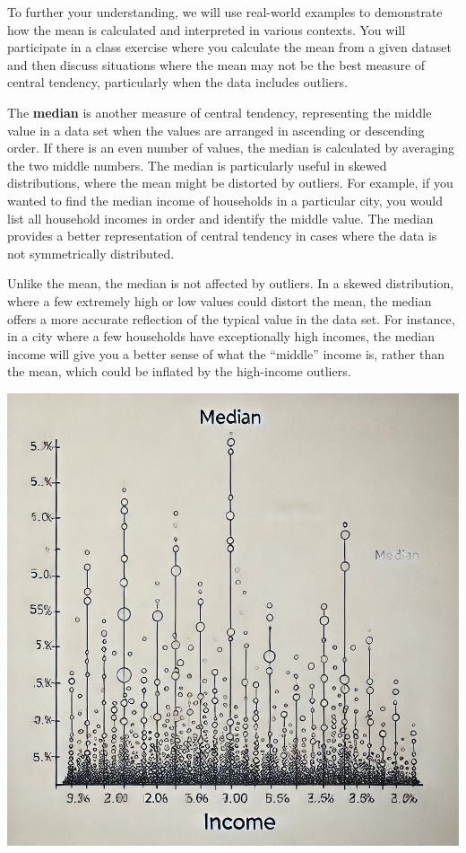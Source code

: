 \documentclass[
]{book}
\begin{document}
To further your understanding, we will use real-world examples to demonstrate how the mean is calculated and interpreted in various contexts. You will participate in a class exercise where you calculate the mean from a given dataset and then discuss situations where the mean may not be the best measure of central tendency, particularly when the data includes outliers.

The \textbf{median} is another measure of central tendency, representing the middle value in a data set when the values are arranged in ascending or descending order. If there is an even number of values, the median is calculated by averaging the two middle numbers. The median is particularly useful in skewed distributions, where the mean might be distorted by outliers. For example, if you wanted to find the median income of households in a particular city, you would list all household incomes in order and identify the middle value. The median provides a better representation of central tendency in cases where the data is not symmetrically distributed.

Unlike the mean, the median is not affected by outliers. In a skewed distribution, where a few extremely high or low values could distort the mean, the median offers a more accurate reflection of the typical value in the data set. For instance, in a city where a few households have exceptionally high incomes, the median income will give you a better sense of what the ``middle'' income is, rather than the mean, which could be inflated by the high-income outliers.

\includegraphics[width=1\textwidth,height=\textheight]{images/fig047.jpg}
\end{document}
